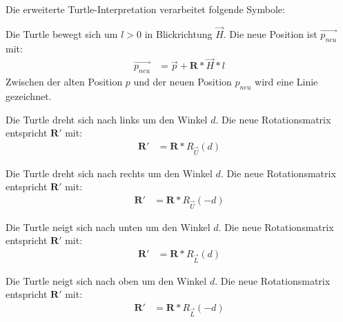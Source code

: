 Die erweiterte Turtle-Interpretation verarbeitet folgende Symbole:

\begin{description}[labelindent]
	\item[\boldmath$F(l)$]  Die Turtle bewegt sich um $l>0$ in Blickrichtung $\overrightarrow{H}$. Die neue Position ist $\overrightarrow{p_{neu}}$ mit:
	\begin{equation}
	\begin{array}{ll}
	\overrightarrow{p_{neu}} & = \overrightarrow{p} + \boldsymbol{R} * \overrightarrow{H} * l
	\end{array}
	\end{equation} 
	Zwischen der alten Position $p$ und der neuen Position $p_{neu}$ wird eine Linie gezeichnet. \\
	
	\item[\boldmath$+(d)$]  Die Turtle dreht sich nach links um den Winkel $d$. Die neue Rotationsmatrix entspricht $\boldsymbol{R'}$ mit:\\
	\begin{equation}
	\begin{array}{ll}
	\boldsymbol{R'} & =  \boldsymbol{R} * R_{\overrightarrow{U}}(d)
	\end{array}
	\end{equation} 
	
	\item[\boldmath$-(d)$]  Die Turtle dreht sich nach rechts um den Winkel $d$. Die neue Rotationsmatrix entspricht $\boldsymbol{R'}$ mit:\\
	\begin{equation}
	\begin{array}{ll}
	\boldsymbol{R'} & =  \boldsymbol{R} * R_{\overrightarrow{U}}(-d)
	\end{array}
	\end{equation} 
	
	\item[\boldmath$\&(d)$]  Die Turtle neigt sich nach unten um den Winkel $d$. Die neue Rotationsmatrix entspricht $\boldsymbol{R'}$ mit:\\
	\begin{equation}
	\begin{array}{ll}
	\boldsymbol{R'} & =  \boldsymbol{R} * R_{\overrightarrow{L}}(d)
	\end{array}
	\end{equation}
	
	\item[\boldmath$\wedge(d)$]  Die Turtle neigt sich nach oben um den Winkel $d$. Die neue Rotationsmatrix entspricht $\boldsymbol{R'}$ mit:\\
	\begin{equation}
	\begin{array}{ll}
	\boldsymbol{R'} & =  \boldsymbol{R} * R_{\overrightarrow{L}}(-d)
	\end{array}
	\end{equation}
	

\end{description}
